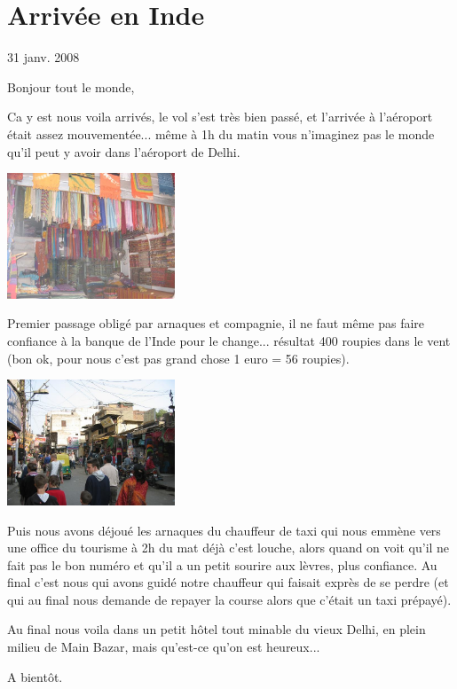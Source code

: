 \section{Arrivée en Inde}

31 janv. 2008

\begin{multicols}{2}

Bonjour tout le monde,

Ca y est nous voila arrivés, le vol s'est très bien passé, et l'arrivée à l'aéroport était assez mouvementée... même à 1h du matin vous n'imaginez pas le monde qu'il peut y avoir dans l'aéroport de Delhi.

\smallbreak
\hspace*{-0.65cm}
\includegraphics[width=5cm]{articles/Arrivee-en-inde/magasin.jpg}
\smallbreak

Premier passage obligé par arnaques et compagnie, il ne faut même pas faire confiance à la banque de l'Inde pour le change... résultat 400 roupies dans le vent (bon ok, pour nous c'est pas grand chose 1 euro = 56 roupies).

\smallbreak
\hspace*{-0.65cm}
\includegraphics[width=5cm]{articles/Arrivee-en-inde/rue.jpg}
\smallbreak

Puis nous avons déjoué les arnaques du chauffeur de taxi qui nous emmène vers une office du tourisme à 2h du mat déjà c'est louche, alors quand on voit qu'il ne fait pas le bon numéro et qu'il a un petit sourire aux lèvres, plus confiance. Au final c'est nous qui avons guidé notre chauffeur qui faisait exprès de se perdre (et qui au final nous demande de repayer la course alors que c'était un taxi prépayé).

Au final nous voila dans un petit hôtel tout minable du vieux Delhi, en plein milieu de Main Bazar, mais qu'est-ce qu'on est heureux...

A bientôt.


\end{multicols}


